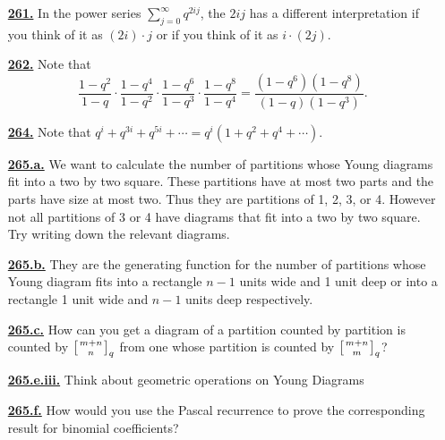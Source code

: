 \documentclass[10pt,]{book}
\theoremstyle{plain}
\theoremstyle{definition}
\theoremstyle{definition}
\theoremstyle{definition}
\numberwithin{equation}{chapter}
\newcommand{\qchoose}[2]{\left[{#1\atop#2}\right]_q}
\begin{document}
\begin{itemize}[itemsep=1em]
\hypertarget{a-261}{}\item[\textbf{\hyperref[activity-261]{261.}}]
\hypertarget{p-1193}{}%
In the power series \(\sum_{j=0}^\infty q^{2ij}\), the \(2ij\) has a different interpretation if you think of it as \((2i) \cdot j\) or if you think of it as \(i \cdot (2j)\).%

\hypertarget{a-262}{}\item[\textbf{\hyperref[activity-262]{262.}}]
\hypertarget{p-1196}{}%
Note that%
\begin{equation*}
\frac{1-q^2}{1-q}\cdot \frac{1-q^4}{1-q^2}\cdot \frac{1-q^6}{1-q^3}\cdot \frac{1-q^8}{1-q^4} = \frac{(1-q^6)(1-q^8)}{(1-q)(1-q^3)} \text{.}
\end{equation*}
%

\hypertarget{a-264}{}\item[\textbf{\hyperref[activity-264]{264.}}]
\hypertarget{p-1206}{}%
Note that \(q^i + q^{3i} + q^{5i} + \cdots = q^i (1 + q^2 + q^4 + \cdots)\).%

\hypertarget{a-265.a}{}\item[\textbf{\hyperref[task-210]{265.a.}}]
\hypertarget{p-1210}{}%
We want to calculate the number of partitions whose Young diagrams fit into a two by two square. These partitions have at most two parts and the parts have size at most two. Thus they are partitions of 1, 2, 3, or 4. However not all partitions of 3 or 4 have diagrams that fit into a two by two square. Try writing down the relevant diagrams.%

\hypertarget{a-265.b}{}\item[\textbf{\hyperref[task-211]{265.b.}}]
\hypertarget{p-1213}{}%
They are the generating function for the number of partitions whose Young diagram fits into a rectangle \(n - 1\) units wide and 1 unit deep or into a rectangle 1 unit wide and \(n - 1\) units deep respectively.%

\hypertarget{a-265.c}{}\item[\textbf{\hyperref[task-212]{265.c.}}]
\hypertarget{p-1216}{}%
How can you get a diagram of a partition counted by partition is counted by \(\qchoose{m+n}{n}\) from one whose partition is counted by \(\qchoose{m+n}{m}\)?%

\hypertarget{a-265.e.iii}{}\item[\textbf{\hyperref[task-217]{265.e.iii.}}]
\hypertarget{p-1228}{}%
Think about geometric operations on Young Diagrams%

\hypertarget{a-265.f}{}\item[\textbf{\hyperref[task-218]{265.f.}}]
\hypertarget{p-1231}{}%
How would you use the Pascal recurrence to prove the corresponding result for binomial coefficients?%


\end{itemize}
\end{document}
